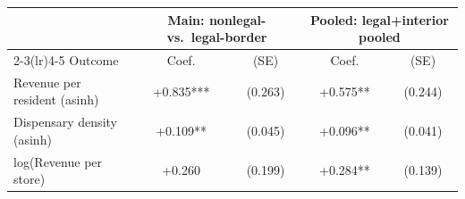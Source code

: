 \begin{tabular}{@{}lcccc@{}}
\toprule
 & \multicolumn{2}{c}{Main: nonlegal- vs.\ legal-border} & \multicolumn{2}{c}{Pooled: legal+interior pooled} \\
\cmidrule(lr){2-3}\cmidrule(lr){4-5}
Outcome & Coef. & (SE) & Coef. & (SE) \\
\midrule
Revenue per resident (asinh) & +0.835*** & (0.263) & +0.575** & (0.244) \\
Dispensary density (asinh) & +0.109** & (0.045) & +0.096** & (0.041) \\
log(Revenue per store) & +0.260 & (0.199) & +0.284** & (0.139) \\
\bottomrule
\end{tabular}
